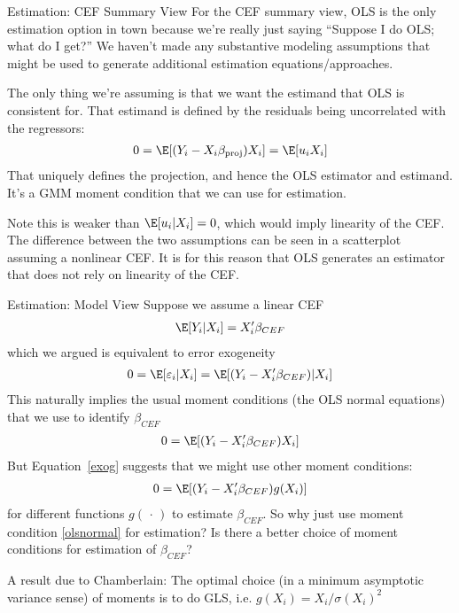 \documentclass[aspectratio=169, handout]{beamer}
\begin{document}
{\footnotesize
\begin{frame}{Estimation: CEF Summary View}
For the CEF summary view, OLS is the \alert{only} estimation option in
town because we're really just saying ``Suppose I do OLS; what do I
get?''
We haven't made any substantive modeling assumptions that might be used
to generate additional estimation equations/approaches.

The only thing we're assuming is that we \alert{want} the estimand that
OLS is consistent for.
That estimand is \alert{defined} by the residuals being uncorrelated
with the regressors:
\begin{align*}
  0
  =
  \E[(Y_i-X_i\beta_{\text{proj}})X_i]
  =
  \E[u_iX_i]
\end{align*}
That uniquely defines the projection, and hence the OLS estimator and
estimand.
It's a GMM moment condition that we can use for estimation.

Note this is weaker than $\E[u_i|X_i]=0$, which would imply linearity of
the CEF.
The difference between the two assumptions can be seen in a scatterplot
assuming a nonlinear CEF.
It is for this reason that OLS generates an estimator that
\alert{does not rely on} linearity of the CEF.


\end{frame}
}


{\footnotesize
\begin{frame}{Estimation: Model View}
Suppose we assume a linear CEF
\begin{align}
  \E[Y_i|X_i]
  =
  X_i'\beta_{CEF}
\end{align}
which we argued is equivalent to error exogeneity
\begin{align}
  0
  =\E[\varepsilon_i|X_i]
  =\E[(Y_i-X_i'\beta_{CEF})|X_i]
  \label{exog}
\end{align}
This naturally implies the usual \alert{moment conditions} (the OLS
normal equations) that we use to identify $\beta_{CEF}$
\begin{align}
  0
  =\E[(Y_i-X_i'\beta_{CEF})X_i]
  \label{olsnormal}
\end{align}
But Equation~\ref{exog} suggests that we might use other moment
conditions:
\begin{align*}
  0
  =\E[(Y_i-X_i'\beta_{CEF})g(X_i)]
\end{align*}
for different functions $g(\,\cdot\,)$ to estimate $\beta_{CEF}$.
So why just use moment condition \ref{olsnormal} for estimation?
Is there a better choice of moment conditions for estimation
of $\beta_{CEF}$?

A result due to Chamberlain:
The \alert{optimal} choice (in a minimum asymptotic variance sense) of
moments is to do GLS, i.e. $g(X_i)=X_i/\sigma(X_i)^2$
\end{frame}
}
\end{document}
